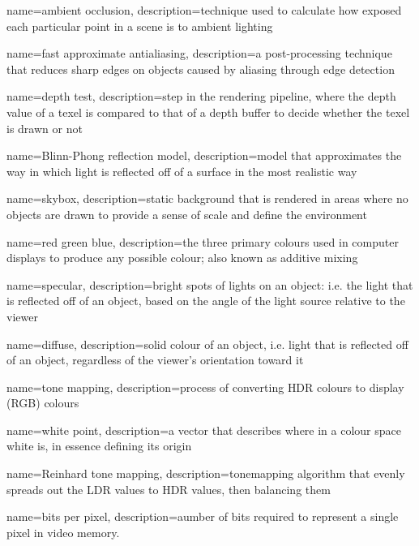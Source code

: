  {
  name=ambient occlusion,
  description={technique used to calculate how exposed each particular point in a scene is to ambient lighting}
}

 {
  name=fast approximate antialiasing,
  description={a post-processing technique that reduces sharp edges on objects caused by \gls{aliasing} through edge detection}
}

 {
  name=depth test,
  description={step in the rendering pipeline, where the depth value of a texel is compared to that of a depth buffer to decide whether the texel is drawn or not}
}

 {
  name=Blinn-Phong reflection model,
  description={model that approximates the way in which light is reflected off of a surface in the most realistic way}
}

 {
  name=skybox,
  description={static background that is rendered in areas where no objects are drawn to provide a sense of scale and define the environment}
}

 {
  name=red green blue,
  description={the three primary colours used in computer displays to produce any possible colour; also known as additive mixing}
}

 {
  name=specular,
  description={bright spots of lights on an object: i.e. the light that is reflected off of an object, based on the angle of the light source relative to the viewer}
}

 {
  name=diffuse,
  description={solid colour of an object, i.e. light that is reflected off of an object, regardless of the viewer's orientation toward it}
}

 {
  name=tone mapping,
  description={process of converting \gls{HDR} colours to display (\gls{RGB}) colours}
}

 {
  name=white point,
  description={a vector that describes where in a colour space white is, in essence defining its origin}
}

 {
  name=Reinhard tone mapping,
  description={\gls{tonemapping} algorithm that evenly spreads out the \gls{LDR} values to \gls{HDR} values, then balancing them}
}

 {
  name=bits per pixel,
  description={aumber of bits required to represent a single pixel in video memory.}
}
